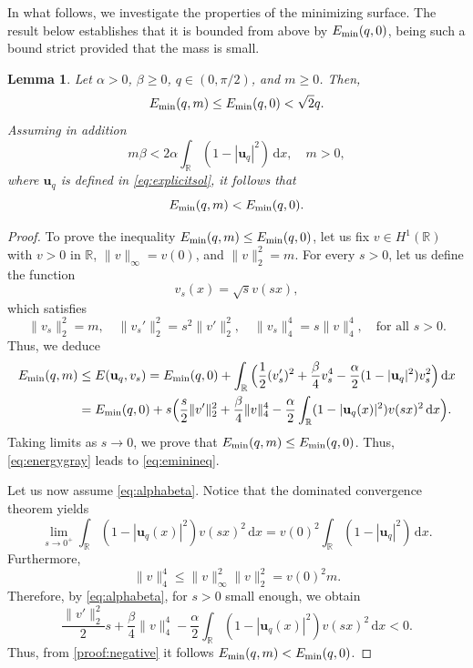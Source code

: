 \documentclass[11pt]{article}
\newcommand{\R}{\mathbb{R}}
\newcommand{\Emin}{E_\textup{min}}
\newcommand{\bu}{\mathbf{u}}
\renewcommand{\d}{\,\mathrm{d}}
\theoremstyle{plain}
\newtheorem{lemma}[theorem]{Lemma}
\theoremstyle{definition}
\theoremstyle{remark}
\numberwithin{equation}{section}
\begin{document}
{In what follows, we investigate the properties of the minimizing surface. The result below establishes that it is bounded from above by $\Emin(q,0)$, being such a bound strict provided that the mass is small.

\begin{lemma}\label{lemma:smallE}
    Let $\alpha>0$, $\beta\geq 0$, $q\in(0,\pi/2)$, and $m\geq 0$. Then, 
    \begin{equation}\label{eq:eminineq}
        \Emin(q,m)\leq \Emin(q,0)<\sqrt{2}q.
    \end{equation}
    Assuming in addition 
    \begin{equation}\label{eq:alphabeta}
        m\beta< 2\alpha\int_\R(1-|\mathbf{u}_q|^2)\d x, \quad m>0,
    \end{equation}
    where $\bu_q$ is defined in \eqref{eq:explicitsol}, it follows that
    \begin{equation}\label{eq:keyineq}
        \Emin(q,m)<\Emin(q,0).
    \end{equation}
\end{lemma}


\begin{proof}
     To prove the inequality $\Emin(q,m)\leq \Emin(q,0)$, let us fix $v\in H^1(\R)$ with $v> 0$ in $\R$, $\|v\|_\infty=v(0)$, and $\|v\|_2^2=m$. For every $s>0$, let us define the function 
    \[v_s(x)=\sqrt{s}v(sx),\]
    which satisfies
    \[\|v_s\|_2^2=m,\quad \|v_{s}'\|^2_2=s^2\|v'\|_2^2,\quad\|v_s\|_4^4=s\|v\|_4^4,\quad\text{for all }s>0.\]
    Thus, we deduce 
    \begin{align}
        \nonumber\Emin(q,m)&\leq E(\bu_q,v_s)=\Emin(q,0) + \int_\R\Big(\frac12(v_s')^2+\frac{\beta}{4}v_s^4 - \frac{\alpha}{2}(1-|\bu_q|^2)v_s^2\Big)\d x
        \\
        \label{proof:negative}
        &=\Emin(q,0)+s\Big(\frac{s}{2} \|v'\|_2^2 +\frac{\beta}{4}\|v\|_4^4 -\frac{\alpha}{2}\int_\R(1-|\bu_q(x)|^2) v(sx)^2 \d x\Big).
    \end{align}
    Taking limits as $s\to 0$, we prove that $\Emin(q,m)\leq\Emin(q,0)$. Thus, \eqref{eq:energygray} leads to \eqref{eq:eminineq}. 
    
   Let us now assume \eqref{eq:alphabeta}. Notice that the dominated convergence theorem yields
    \[\lim_{s\to 0^+}\int_\R(1-|\bu_q(x)|^2)v(sx)^2\d x =  v(0)^2\int_\R (1-|\bu_q|^2)\d x.\]
    Furthermore,
    \[\|v\|^4_4\leq\|v\|^2_\infty\|v\|_2^2=v(0)^2 m.\]
    Therefore, by \eqref{eq:alphabeta}, for $s>0$ small enough, we obtain
    \[\frac{\|v'\|_2^2}{2} s +\frac{\beta}{4}\|v\|_4^4 -\frac{\alpha}{2}\int_\R(1-|\bu_q(x)|^2) v(sx)^2 \d x<0.\]
    Thus, from \eqref{proof:negative} it follows  $\Emin(q,m)<\Emin(q,0)$. 
\end{proof}

}
\end{document}
